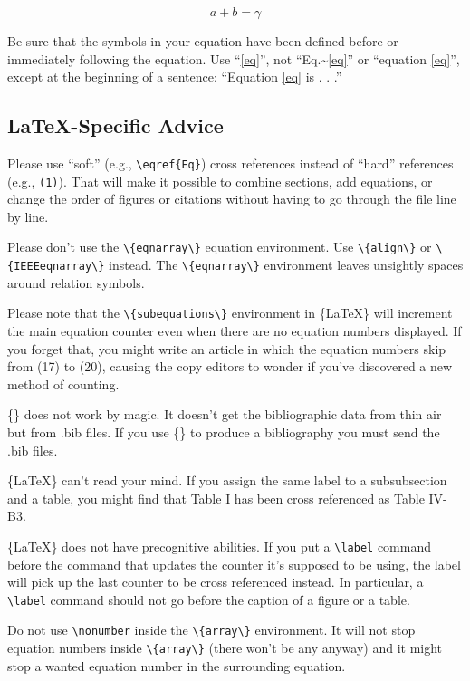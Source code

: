 \documentclass[conference]{IEEEtran}
\begin{document}
 \begin{equation}
a+b=\gamma\label{eq}
 \end{equation}

Be sure that the symbols in your equation have been defined before or immediately following the equation. Use ``\eqref{eq}'', not ``Eq.\textasciitilde{}\eqref{eq}'' or ``equation \eqref{eq}'', except at the beginning of a sentence: ``Equation \eqref{eq} is . . .''

\subsection{\LaTeX{}-Specific Advice}
\label{sec:orga69c862}
Please use ``soft'' (e.g., \verb|\eqref{Eq}|) cross references instead of ``hard'' references (e.g., \verb|(1)|). That will make it possible to combine sections, add equations, or change the order of figures or citations without having to go through the file line by line.

Please don't use the \verb|\{eqnarray\}| equation environment. Use \verb|\{align\}| or \verb|\{IEEEeqnarray\}| instead. The \verb|\{eqnarray\}| environment leaves unsightly spaces around relation symbols.

Please note that the \verb|\{subequations\}| environment in \{\LaTeX\} will increment the main equation counter even when there are no equation numbers displayed. If you forget that, you might write an article in which the equation numbers skip from (17) to (20), causing the copy editors to wonder if you've discovered a new method of counting.

\{\BibTeX\} does not work by magic. It doesn't get the bibliographic data from thin air but from .bib files. If you use \{\BibTeX\} to produce a bibliography you must send the .bib files.

\{\LaTeX\} can't read your mind. If you assign the same label to a subsubsection and a table, you might find that Table I has been cross referenced as Table IV-B3.

\{\LaTeX\} does not have precognitive abilities. If you put a \verb|\label| command before the command that updates the counter it's supposed to be using, the label will pick up the last counter to be cross referenced instead. In particular, a \verb|\label| command should not go before the caption of a figure or a table.

Do not use \verb|\nonumber| inside the \verb|\{array\}| environment. It will not stop equation numbers inside \verb|\{array\}| (there won't be any anyway) and it might stop a wanted equation number in the surrounding equation.
\end{document}
